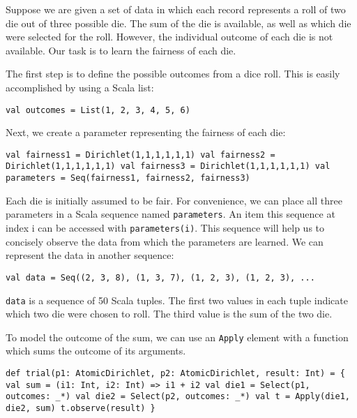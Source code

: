 Suppose we are given a set of data in which each record represents a roll of two die out of three possible die. The sum of the die is available, as well as which die were selected for the roll. However, the individual outcome of each die is not available. Our task is to learn the fairness of each die.

The first step is to define the possible outcomes from a dice roll. This is easily accomplished by using a Scala list:

\begin{flushleft}
\texttt{val outcomes = List(1, 2, 3, 4, 5, 6)}
\end{flushleft}

Next, we create a parameter representing the fairness of each die:

\begin{flushleft}
\texttt{val fairness1 = Dirichlet(1,1,1,1,1,1) 
\newline val fairness2 = Dirichlet(1,1,1,1,1,1) 
\newline val fairness3 = Dirichlet(1,1,1,1,1,1) 
\newline val parameters = Seq(fairness1, fairness2, fairness3)
}
\end{flushleft}

Each die is initially assumed to be fair. For convenience, we can place all three parameters in a Scala sequence named \texttt{parameters}.  An item this sequence at index i can be accessed with \texttt{parameters(i)}. This sequence will help us to concisely observe the data from which the parameters are learned. We can represent the data in another sequence:

\begin{flushleft}
\texttt{val data = Seq((2, 3, 8), (1, 3, 7), (1, 2, 3), (1, 2, 3), ...}
\end{flushleft}

\texttt{data} is a sequence of 50 Scala tuples. The first two values in each tuple indicate which two die were chosen to roll. The third value is the sum of the two die.

To model the outcome of the sum, we can use an \texttt{Apply} element with a function which sums the outcome of its arguments.

\begin{flushleft}
\texttt{def trial(p1: AtomicDirichlet, p2: AtomicDirichlet, result: Int) = \{
\newline \tab val sum = (i1: Int, i2: Int) => i1 + i2 
\newline \tab val die1 = Select(p1, outcomes: \_*)
\newline \tab val die2 = Select(p2, outcomes: \_*)
\newline \tab val t = Apply(die1, die2, sum)
\newline \tab t.observe(result)
\newline \}
}
\end{flushleft}

